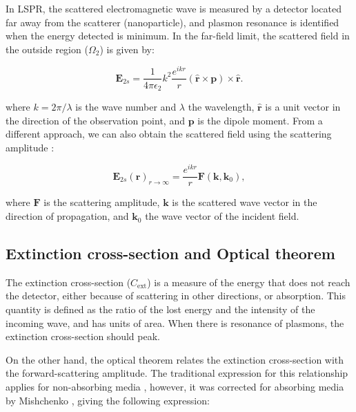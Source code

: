 In LSPR, the scattered electromagnetic wave is measured by a detector located far away 
from the scatterer (nanoparticle), and plasmon resonance is identified when the energy 
detected is minimum. In the far-field limit, the scattered field
in the outside region ($\Omega_2$) is given by: 

\begin{equation} \label{eq:scat_efield_long_range}
    \mathbf{E}_{2s} = \frac{1}{4\pi\epsilon_2}k^2\frac{e^{ikr}}{r} (\mathbf{\hat{r}} \times \mathbf{p})\times\mathbf{\hat{r}}.
\end{equation} 

\noindent where $k=2\pi/\lambda$ is the wave number and $\lambda$ the wavelength, $\mathbf{\hat{r}}$ 
is a unit vector in the direction of the observation point, and $\mathbf{p}$ is
the dipole moment.
From a different approach, we can also obtain the scattered field using the 
scattering amplitude \cite{Jackson}:

\begin{equation} \label{eq:scat_efield_fwa}
    \mathbf{E}_{2s}(\mathbf{r})_{r\to\infty} = \frac{e^{ikr}}{r} \mathbf{F}(\mathbf{k},\mathbf{k}_0),
\end{equation}

\noindent where $\mathbf{F}$ is the scattering amplitude, $\mathbf{k}$ is the 
scattered wave vector in the direction of propagation, and $\mathbf{k}_0$ the 
wave vector of the incident field. 

\subsection{Extinction cross-section and Optical theorem} \label{sec:cext_ot}

The extinction cross-section ($C_\text{ext}$) is a measure of the energy that 
does not reach the detector, either because of scattering in other directions,
or absorption. This quantity is defined as the ratio of the lost energy and 
the intensity of the incoming wave, and has units of area. When there is 
resonance of plasmons, the extinction cross-section should peak.

On the other hand, the optical theorem relates the extinction cross-section with 
the forward-scattering amplitude. 
The traditional expression for this relationship applies for non-absorbing media 
\cite{MayergoyzZhang2007, Jackson}, however, it was corrected for absorbing media 
by Mishchenko \cite{Mishchenko2007}, giving the following expression:

